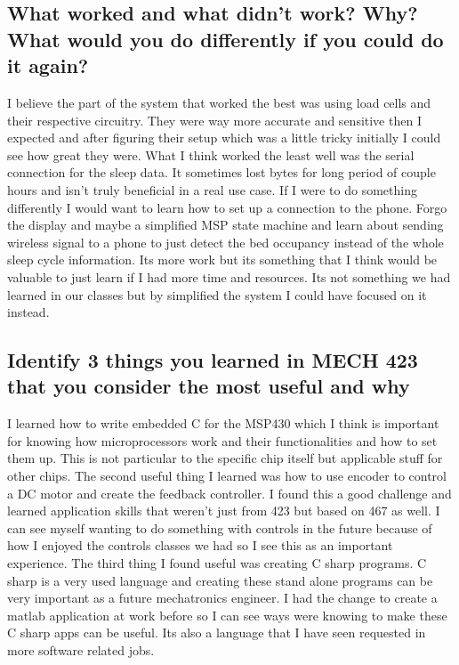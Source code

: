 \documentclass[11pt]{article}
\begin{document}
\subsection*{What worked and what didn’t work? Why? What would you do differently if you could do it again?}
I believe the part of the system that worked the best was using load cells and their respective circuitry. 
They were way more accurate and sensitive then I expected and after figuring their setup which was a little tricky initially I could see how great they were. 
What I think worked the least well was the serial connection for the sleep data. 
It sometimes lost bytes for long period of couple hours and isn't truly beneficial in a real use case. 
If I were to do something differently I would want to learn how to set up a connection to the phone. 
Forgo the display and maybe a simplified MSP state machine and learn about sending wireless signal to a phone to just detect the bed occupancy instead of the whole sleep cycle information. 
Its more work but its something that I think would be valuable to just learn if I had more time and resources.
Its not something we had learned in our classes but by simplified the system I could have focused on it instead. 

\subsection*{Identify 3 things you learned in MECH 423 that you consider the most useful and why}
I learned how to write embedded C for the MSP430 which I think is important for knowing how microprocessors work and their functionalities and how to set them up. 
This is not particular to the specific chip itself but applicable stuff for other chips.
The second useful thing I learned was how to use encoder to control a DC motor and create the feedback controller. 
I found this a good challenge and learned application skills that weren't just from 423 but based on 467 as well.
I can see myself wanting to do something with controls in the future because of how I enjoyed the controls classes we had so I see this as an important experience.
The third thing I found useful was creating C sharp programs. 
C sharp is a very used language and creating these stand alone programs can be very important as a future mechatronics engineer.  
I had the change to create a matlab application at work before so I can see ways were knowing to make these C sharp apps can be useful.
Its also a language that I have seen requested in more software related jobs.
\end{document}
